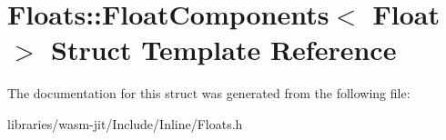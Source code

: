 \hypertarget{struct_floats_1_1_float_components}{}\section{Floats\+:\+:Float\+Components$<$ Float $>$ Struct Template Reference}
\label{struct_floats_1_1_float_components}


The documentation for this struct was generated from the following file\+:\begin{DoxyCompactItemize}
\item 
libraries/wasm-\/jit/\+Include/\+Inline/Floats.\+h\end{DoxyCompactItemize}
